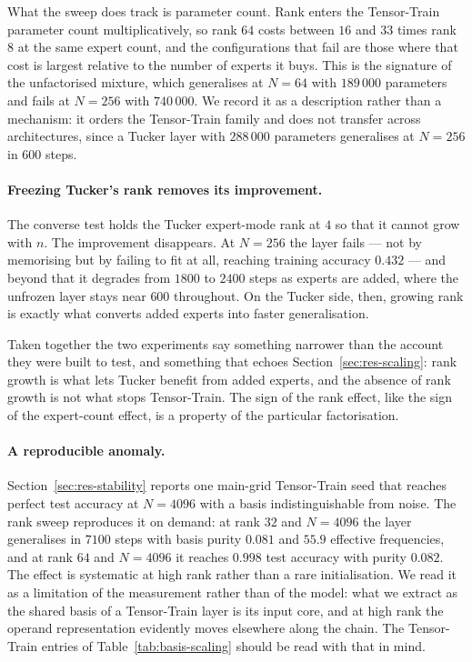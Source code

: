 What the sweep does track is parameter count. Rank enters the Tensor-Train
parameter count multiplicatively, so rank $64$ costs between $16$ and $33$
times rank $8$ at the same expert count, and the configurations that fail are
those where that cost is largest relative to the number of experts it buys.
This is the signature of the unfactorised mixture, which generalises at
$N = 64$ with $189\,000$ parameters and fails at $N = 256$ with $740\,000$. We
record it as a description rather than a mechanism: it orders the Tensor-Train
family and does not transfer across architectures, since a Tucker layer with
$288\,000$ parameters generalises at $N = 256$ in $600$ steps.

\paragraph{Freezing Tucker's rank removes its improvement.} The converse test
holds the Tucker expert-mode rank at $4$ so that it cannot grow with $n$. The
improvement disappears. At $N = 256$ the layer fails --- not by memorising but
by failing to fit at all, reaching training accuracy $0.432$ --- and beyond
that it degrades from $1800$ to $2400$ steps as experts are added, where the
unfrozen layer stays near $600$ throughout. On the Tucker side, then, growing
rank is exactly what converts added experts into faster generalisation.

Taken together the two experiments say something narrower than the account they
were built to test, and something that echoes
Section~\ref{sec:res-scaling}: rank growth is what lets Tucker benefit from
added experts, and the absence of rank growth is not what stops Tensor-Train.
The sign of the rank effect, like the sign of the expert-count effect, is a
property of the particular factorisation.

\paragraph{A reproducible anomaly.} Section~\ref{sec:res-stability} reports one
main-grid Tensor-Train seed that reaches perfect test accuracy at $N = 4096$
with a basis indistinguishable from noise. The rank sweep reproduces it on
demand: at rank $32$ and $N = 4096$ the layer generalises in $7100$ steps with
basis purity $0.081$ and $55.9$ effective frequencies, and at rank $64$ and
$N = 4096$ it reaches $0.998$ test accuracy with purity $0.082$. The effect is
systematic at high rank rather than a rare initialisation. We read it as a
limitation of the measurement rather than of the model: what we extract as the
shared basis of a Tensor-Train layer is its input core, and at high rank the
operand representation evidently moves elsewhere along the chain. The
Tensor-Train entries of Table~\ref{tab:basis-scaling} should be read with that
in mind.

